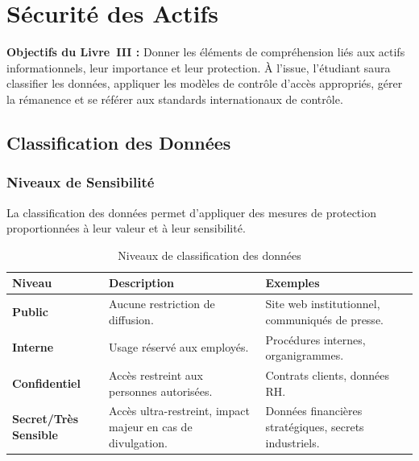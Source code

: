 
\chapter{Sécurité des Actifs}
\label{chap:securite_actifs}

\begin{boxobjectifs}
\textbf{Objectifs du Livre~III :} Donner les éléments de compréhension liés aux actifs informationnels, leur importance et leur protection. À l'issue, l'étudiant saura classifier les données, appliquer les modèles de contrôle d'accès appropriés, gérer la rémanence et se référer aux standards internationaux de contrôle.
\end{boxobjectifs}

\section{Classification des Données}

\subsection{Niveaux de Sensibilité}

La classification des données permet d'appliquer des mesures de protection proportionnées à leur valeur et à leur sensibilité.

\begin{table}[H]
\centering
\begin{tabular}{p{3cm}p{5cm}p{4cm}}
    \toprule
    \textbf{Niveau} & \textbf{Description} & \textbf{Exemples} \\
    \midrule
    \textbf{Public}        & Aucune restriction de diffusion. & Site web institutionnel, communiqués de presse. \\
    \textbf{Interne}       & Usage réservé aux employés. & Procédures internes, organigrammes. \\
    \textbf{Confidentiel}  & Accès restreint aux personnes autorisées. & Contrats clients, données RH. \\
    \textbf{Secret/Très Sensible} & Accès ultra-restreint, impact majeur en cas de divulgation. & Données financières stratégiques, secrets industriels. \\
    \bottomrule
\end{tabular}
\caption{Niveaux de classification des données}
\end{table}

